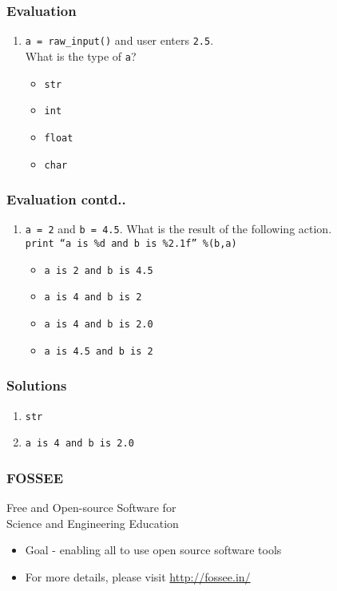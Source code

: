 \documentclass[17pt,compress]{beamer}
\newcounter{saveenumi}
\newcommand{\seti}{\setcounter{saveenumi}{\value{enumi}}}
\newcommand{\conti}{\setcounter{enumi}{\value{saveenumi}}}
\begin{document}
\begin{frame}
\frametitle{Evaluation}
\label{sec-8.1}
\begin{enumerate}
\item \texttt{a = raw\_input()} and user enters \texttt{2.5}.\\\pause
   What is the type of \texttt{a}?\pause
\begin{itemize}
\item \texttt{str}
\item \texttt{int}
\item \texttt{float}
\item \texttt{char}
\end{itemize}
\seti
\end{enumerate}
\end{frame}
\begin{frame}
\frametitle{Evaluation contd..}
\label{sec-8.1}
\begin{enumerate}
\conti
\item \texttt{a = 2} and \texttt{b = 4.5}. 
   What is the result of the following action.\\
  \texttt{print ``a is \%d and b is \%2.1f'' \%(b,a)} \pause
\begin{itemize}
\item \texttt{a is 2 and b is 4.5}
\item \texttt{a is 4 and b is 2}
\item \texttt{a is 4 and b is 2.0}
\item \texttt{a is 4.5 and b is 2}
\end{itemize}
\end{enumerate}
\end{frame}
\begin{frame}
\frametitle{Solutions}
\label{sec-9}

\begin{enumerate}
\item \texttt{str}\pause
\vspace{12pt}
\item \texttt{a is 4 and b is 2.0}
\end{enumerate}
\end{frame}
\begin{frame}
\frametitle{FOSSEE}
{\color{blue}Free and Open-source Software for \\Science and Engineering Education} \\
\begin{itemize}
\item Goal - enabling all to use open source software tools
\item For more details, please visit {\color{blue}\url{http://fossee.in/}}
\end{itemize}
\end{frame}
\end{document}
